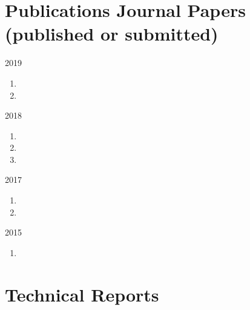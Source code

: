 
\section*{Publications {\small Journal Papers (published or submitted)}}

\begin{paracol}{2}
  \textsc{2019}
\switchcolumn
  \begin{enumerate}
    \item {}
    \item {}
    \setcounter{pubcounter}{\theenumi}
  \end{enumerate}
\end{paracol}

\begin{paracol}{2}
  \textsc{2018}
\switchcolumn
  \begin{enumerate}
    \setcounter{enumi}{\thepubcounter}
    \item {}
    \item {}
    \item {}
    \setcounter{pubcounter}{\theenumi}
  \end{enumerate}
\end{paracol}

\begin{paracol}{2}
  \textsc{2017}
\switchcolumn
  \begin{enumerate}
    \setcounter{enumi}{\thepubcounter}
    \item {}
    \item {}
    \setcounter{pubcounter}{\theenumi}
  \end{enumerate}
\end{paracol}

\begin{paracol}{2}
  \textsc{2015}
\switchcolumn
  \begin{enumerate}
    \setcounter{enumi}{\thepubcounter}
    \item {}
    \setcounter{pubcounter}{\theenumi}
  \end{enumerate}
\end{paracol}

\section*{Technical Reports}

